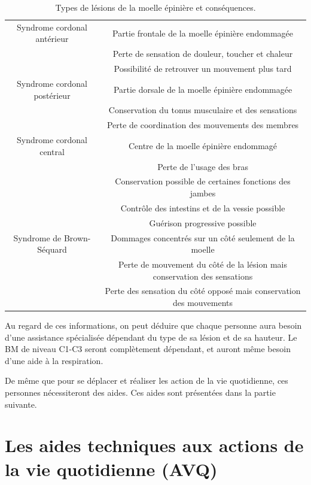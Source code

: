 \documentclass[letterpaper, twoside, 12pt, memoire, creativecommons, hyperref]{thETS}
\begin{document}
\begin{table}[ht]
	\caption{Types de lésions de la moelle épinière et conséquences.}
		\begin{tabular}{|c|c|}
		\hline
	    	 	Syndrome cordonal antérieur & Partie frontale de la moelle épinière endommagée\\
	    	 	& Perte de sensation de douleur, toucher et chaleur\\
	    	 	& Possibilité de retrouver un mouvement plus tard\\
	    \hline
	    	 	Syndrome cordonal postérieur & Partie dorsale de la moelle épinière endommagée\\
	    	 	& Conservation du tonus musculaire et des sensations \\
	    	 	& Perte de coordination des mouvements des membres\\
	    \hline
	    		Syndrome cordonal central & Centre de la moelle épinière endommagé\\
	    		& Perte de l'usage des bras\\
	    		& Conservation possible de certaines fonctions des jambes\\
	    		& Contrôle des intestins et de la vessie possible \\
	    		& Guérison progressive possible\\
	    	\hline
	    		Syndrome de Brown-Séquard & Dommages concentrés sur un côté seulement de la moelle \\
	    		& Perte de mouvement du côté de la lésion mais conservation des sensations\\
	    		& Perte des sensation du côté opposé mais conservation des mouvements\\
	    \hline
		\end{tabular}
	\label{tab:typelesion}
\end{table}

Au regard de ces informations, on peut déduire que chaque personne aura besoin d'une assistance spécialisée dépendant du type de sa lésion et de sa hauteur. Le BM de niveau C1-C3 seront complètement dépendant, et auront même besoin d'une aide à la respiration. 

De même que pour se déplacer et réaliser les action de la vie quotidienne, ces personnes nécessiteront des aides. Ces aides sont présentées dans la partie suivante.

\section{Les aides techniques aux actions de la vie quotidienne (AVQ)}
\end{document}
